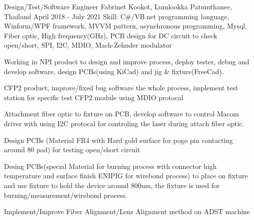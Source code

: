 \begin{cventries}
  \cventry
    {Design/Test/Software Engineer} %
    {Fabrinet} %
    {Kookot, Lumlookka Patumthanee, Thailand} %
    {April 2018 - July 2021} %
    {Skill: C\#/VB.net programming language, Winform/WPF framework, MVVM
    pattern, asynchronous programming, Mysql, Fiber optic, High frequency(GHz), PCB
    design for DC circuit to check open/short, SPI, I2C, MDIO, Mach-Zehnder modulator} %
    {
      \begin{cvitems} %
        \item {Working in NPI product to design and improve process,
          deploy tester, debug and develop software, design PCBs(using KiCad)
          and jig \& fixture(FreeCad).}
        \item {CFP2 product, improve/fixed bug software the whole process,
          implement test station for specific test CFP2 module using MDIO
          protocal}
        \item {Attachment fiber optic to fixture on PCB, develop software to
          control Macom driver with using I2C protocal for controling the laser
          during attach fiber optic.}
        \item {Design PCBs (Material FR4 with Hard gold surface for pogo pin
          contacting around 80 pad) for testing open/short circuit}
        \item {Desing PCBs(special Material for burning process with
          connector high temperature and surface finish ENIPIG for wirebond
          process) to place on fixture and use fixture to hold the device
          around 800um, the fixture is used for burning/measurement/wirebond
          process.}
        \item {Implement/Improve Fiber Alignment/Lens Alignment method on ADST machine}
      \end{cvitems}
    }


\end{cventries}
